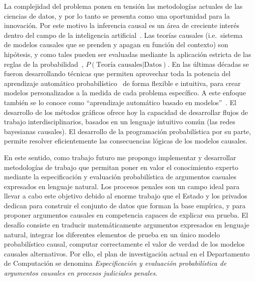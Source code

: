 \documentclass[a4paper,11pt]{book}
\theoremstyle{definition}
\begin{document}
La complejidad del problema ponen en tensi\'on las metodolog\'ias actuales de las ciencias de datos, y por lo tanto se presenta como una oportunidad para la innovaci\'on.
%
Por este motivo la inferencia causal es un \'area de creciente inter\'es dentro del campo de la inteligencia artificial~\cite{pearl2009-causality, peters2017-causalInference}.
%
Las teor\'ias causales (i.e.~sistema de modelos causales que se prenden y apagan en funci\'on del contexto) son hip\'otesis, y como tales pueden ser evaluadas mediante la aplicaci\'on estricta de las reglas de la probabilidad~\cite{winn2012-causality}, $P(\text{Teor\'ia causales}|\text{Datos})$.
%
En las \'ultimas d\'ecadas se fueron desarrollando t\'ecnicas que permiten aprovechar toda la potencia del aprendizaje autom\'atico probabil\'istico~\cite{murphy-pmlBook1,murphy-pmlBook2} de forma flexible e intuitiva, para crear modelos personalizados a la medida de cada problema espec\'ifico.
%
A este enfoque tambi\'en se lo conoce como ``aprendizaje autom\'atico basado en modelos''~\cite{Bishop2013, Bishop2006}.
%
El desarrollo de los m\'etodos gr\'aficos ofrece hoy la capacidad de desarrollar flujos de trabajo interdisciplinarios, basados en un lenguaje intuitivo com\'un (las redes bayesianas causales).
%
El desarrollo de la programaci\'on probabil\'istica por su parte, permite resolver eficientemente las consecuencias l\'ogicas de los modelos causales.


En este sentido, como trabajo futuro me propongo implementar y desarrollar metodolog\'ias de trabajo que permitan poner en valor el conocimiento experto mediante la especificaci\'on y evaluaci\'on probabil\'istica de argumentos casuales expresados en lenguaje natural.
%
Los procesos penales son un campo ideal para llevar a cabo este objetivo debido al enorme trabajo que el Estado y los privados dedican para construir el conjunto de datos que forman la base emp\'irica, y para proponer argumentos causales en competencia capaces de explicar esa prueba.
%
El desaf\'io consiste en traducir matem\'aticamente argumentos expresados en lenguaje natural, integrar los diferentes elementos de prueba en un \'unico modelo probabil\'istico causal, computar correctamente el valor de verdad de los modelos causales alternativos.
%
Por ello, el plan de investigaci\'on actual en el Departamento de Computaci\'on se denomina \emph{Especificaci\'on y evaluaci\'on probabil\'istica de argumentos causales en procesos judiciales penales}.
\end{document}
